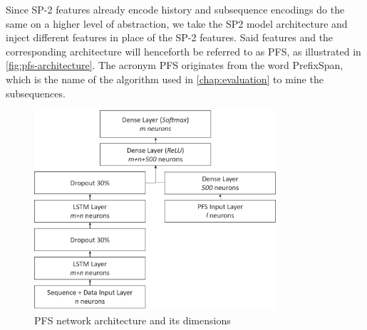 Since SP-2 features already encode history and subsequence encodings do the same on a higher level of abstraction, we take the SP2 model architecture and inject different features in place of the SP-2 features. Said features and the corresponding architecture will henceforth be referred to as PFS, as illustrated in \autoref{fig:pfs-architecture}. The acronym PFS originates from the word PrefixSpan, which is the name of the algorithm used in \autoref{chap:evaluation} to mine the subsequences.

\begin{figure}[ht]
    \centering
    \includegraphics[width=0.8\textwidth]{gfx/pfs-network-architecture.png}
    \caption{PFS network architecture and its dimensions}
    \label{fig:pfs-architecture}
\end{figure}
